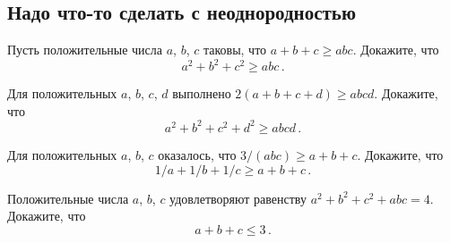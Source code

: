 \subsection*{Надо что-то сделать с неоднородностью}

\begin{problems}

\item
Пусть положительные числа $a$, $b$, $c$ таковы, что $a + b + c \geq abc$.
Докажите, что
\[
    a^2 + b^2 + c^2 \geq a b c
\, . \]

\item
Для положительных $a$, $b$, $c$, $d$ выполнено
\(
    2 (a + b + c + d) \geq a b c d
\).
Докажите, что
\[
    a^2 + b^2 + c^2 + d^2 \geq a b c d
\, . \]

\item
Для положительных $a$, $b$, $c$ оказалось, что
\(
    3 / (a b c) \geq a + b + c
\).
Докажите, что
\[
    1 / a + 1 / b + 1 / c
\geq
    a + b + c
\, . \]

\item
Положительные числа $a$, $b$, $c$ удовлетворяют равенству
\(
    a^2 + b^2 + c^2 + a b c = 4
\).
Докажите, что
\[
    a + b + c \leq 3
\, . \]

\end{problems}

